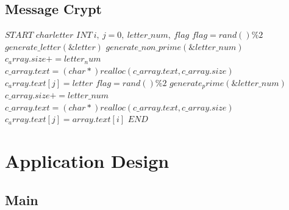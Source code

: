 \documentclass[12]{article}
\begin{document}
\subsection{Message Crypt} 
\begin{algorithmic}[1] 
\STATE $START$
\STATE $char letter$ 
\STATE $INT\ i,\ j = 0 , \ letter \_num, \ flag  $ 
    \STATE $flag = rand() \% 2$ 
            \STATE $generate\_letter( \&letter )$
            \STATE $generate\_non\_prime( \&letter\_num )$
            \STATE $c_array.size += letter_num$
            \STATE$c\_array.text = (char *) realloc( c \_array.text, c \_array.size)$
                     \STATE $c_array.text[j] = letter$ 
                \ENDFOR 
            \STATE $flag = rand() \% 2$ 
        \ENDWHILE  
    \STATE $generate_prime( \&letter\_num )$
    \STATE $c\_array.size += letter\_num$
    \STATE $c \_array.text = (char *) realloc( c\_array.text, c\_array.size)$ 
            \STATE$c_array.text[j] = array.text[i]$ 
        \ENDFOR 
\ENDFOR 
\STATE$END$
\end{algorithmic}  


\newpage
\section{Application Design}
\subsection{Main}
\textbf{} 
\end{document}
